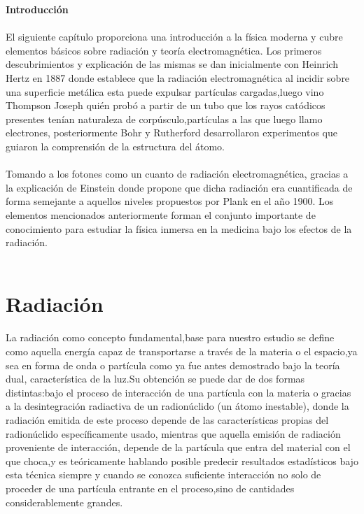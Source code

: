 \documentclass[12pt,fleqn]{book} %
\numberwithin{equation}{section} %
\numberwithin{figure}{section} %
\numberwithin{table}{section} %
\begin{document}
\textbf{Introducción}
\\\\
El siguiente capítulo proporciona una introducción a la física moderna y cubre elementos básicos sobre radiación y  teoría electromagnética. Los primeros descubrimientos y explicación de las mismas se dan inicialmente con 
Heinrich Hertz en 1887 donde establece que la radiación electromagnética al incidir sobre una  superficie metálica esta puede expulsar partículas cargadas,luego vino Thompson Joseph quién probó  a partir de un tubo que los rayos catódicos presentes tenían naturaleza de corpúsculo,partículas a las que luego llamo electrones, posteriormente Bohr y Rutherford desarrollaron experimentos que guiaron la comprensión de la estructura del átomo.
\\\\
Tomando a los fotones como un cuanto de radiación electromagnética, gracias a la explicación de Einstein donde propone que dicha radiación era cuantificada de forma semejante a aquellos niveles propuestos por Plank en el año 1900. Los elementos mencionados anteriormente  forman el conjunto importante de conocimiento para estudiar la física inmersa en la medicina bajo los efectos de la radiación.
\\\\


\section{Radiación}
La radiación como concepto fundamental,base para nuestro estudio se define como aquella energía capaz de transportarse  a través de la materia o el espacio,ya sea en forma de onda o partícula como ya fue antes demostrado bajo la teoría dual, característica de la luz.Su obtención se puede dar de dos formas distintas:bajo el proceso de interacción de una partícula con la materia o gracias a la desintegración radiactiva de un radionúclido (un átomo inestable), donde la radiación emitida de este proceso depende de las características propias del radionúclido específicamente usado, mientras que aquella  emisión de radiación proveniente de  interacción, depende de la partícula que entra  del material con el que choca,y es teóricamente hablando posible predecir resultados estadísticos bajo esta técnica siempre y cuando se conozca suficiente interacción no solo de proceder de una partícula entrante en el proceso,sino de cantidades considerablemente grandes.  
\end{document}

